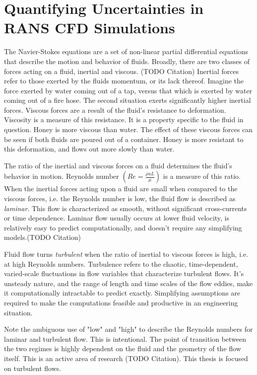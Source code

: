 \chapter{Quantifying Uncertainties in RANS CFD Simulations}

The Navier-Stokes equations are a set of non-linear partial differential equations that describe the motion and behavior of fluids. Broadly, there are two classes of forces acting on a fluid, inertial and viscous. (TODO Citation) Inertial forces refer to those exerted by the fluids momentum, or its lack thereof. Imagine the force exerted by water coming out of a tap, versus that which is exerted by water coming out of a fire hose. The second situation exerts significantly higher inertial forces. Viscous forces are a result of the fluid's resistance to deformation. Viscosity is a measure of this resistance. It is a property specific to the fluid in question. Honey is more viscous than water. The effect of these viscous forces can be seen if both fluids are poured out of a container. Honey is more resistant to this deformation, and flows out more slowly than water.

The ratio of the inertial and viscous forces on a fluid determines the fluid's behavior in motion. Reynolds number $\left ( Re = \frac{\rho u L}{\mu}\right )$ is a measure of this ratio. When the inertial forces acting upon a fluid are small when compared to the viscous forces, i.e. the Reynolds number is low, the fluid flow is described as \textit{laminar}. This flow is characterized as smooth, without significant cross-currents or time dependence. Laminar flow usually occurs at lower fluid velocity, is relatively easy to predict computationally, and doesn't require any simplifying models.(TODO Citation) 

Fluid flow turns \textit{turbulent} when the ratio of inertial to viscous forces is high, i.e. at high Reynolds numbers. Turbulence refers to the chaotic, time-dependent, varied-scale fluctuations in flow variables that characterize turbulent flows. It's unsteady nature, and the range of length and time scales of the flow eddies, make it computationally intractable to predict exactly. Simplifying assumptions are required to make the computations feasible and productive in an engineering situation. 

Note the ambiguous use of "low" and "high" to describe the Reynolds numbers for laminar and turbulent flow. This is intentional. The point of transition between the two regimes is highly dependent on the fluid and the geometry of the flow itself. This is an active area of research (TODO Citation). This thesis is focused on turbulent flows. 

